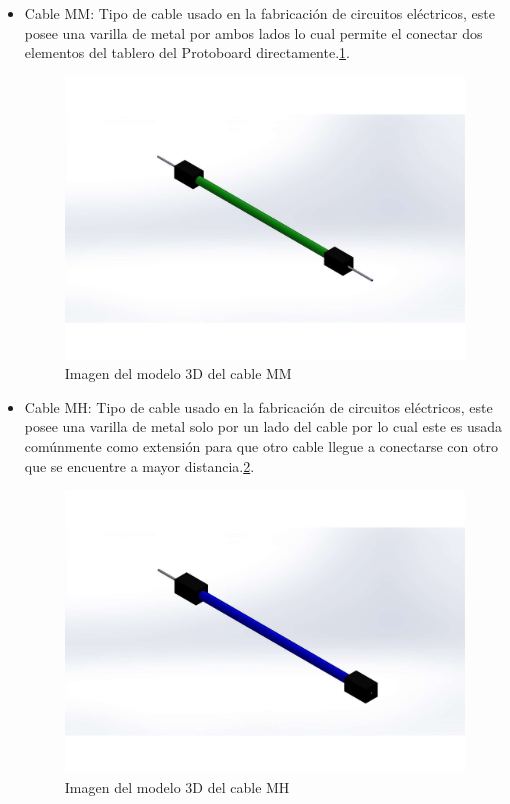 \begin{itemize}
\begin{itemize}
    \item Cable MM: Tipo de cable usado en la fabricación de circuitos eléctricos, este posee una varilla de metal por ambos lados lo cual permite el conectar dos elementos del tablero del Protoboard directamente.\ref{fig:cableMM}.
    
            \begin{figure}[H]
        \centering
        \includegraphics[trim = {70mm 60mm 60mm 50mm},clip,scale=0.5]{19/Img/cableMMFigura.pdf}
        \caption{Imagen del modelo 3D del cable MM}
        \label{fig:cableMM}
    \end{figure}
    
    \item Cable MH: Tipo de cable usado en la fabricación de circuitos eléctricos, este posee una varilla de metal solo por un lado del cable por lo cual este es usada comúnmente como extensión para que otro cable llegue a conectarse con otro que se encuentre a mayor distancia.\ref{fig:cableMH}.
    
            \begin{figure}[H]
        \centering
        \includegraphics[trim = {65mm 30mm 60mm 40mm},clip,scale=0.5]{19/Img/cableMHFigura.pdf}
        \caption{Imagen del modelo 3D del cable MH}
        \label{fig:cableMH}
    \end{figure}
    

\end{itemize}
\end{itemize}
